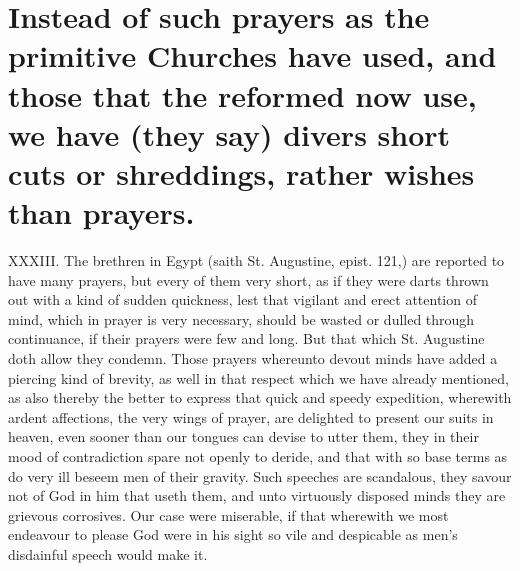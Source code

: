 \section*{Instead of such prayers as the primitive Churches have used, and those that the reformed now use, we have (they say) divers short cuts or shreddings, rather wishes than prayers.}
XXXIII. The brethren in Egypt (saith St. Augustine, epist. 121,) are reported to have many prayers, but every of them very short, as if they were darts thrown out with a kind of sudden quickness, lest that vigilant and erect attention of mind, which in prayer is very necessary, should be wasted or dulled through continuance, if their prayers were few and long. But that which St. Augustine doth allow they  condemn. Those prayers whereunto devout minds have added a piercing kind of brevity, as well in that respect which we have already mentioned, as also thereby the better to express that quick and speedy expedition, wherewith ardent affections, the very wings of prayer, are delighted to present our suits in heaven, even sooner than our tongues can devise to utter them, they in their mood of contradiction spare not openly to deride, and that with so base terms as do very ill beseem men of their gravity. Such speeches are scandalous, they savour not of God in him that useth them, and unto virtuously disposed minds they are grievous corrosives. Our case were miserable, if that wherewith we most endeavour to please God were in his sight so vile and despicable as men’s disdainful speech would make it.

